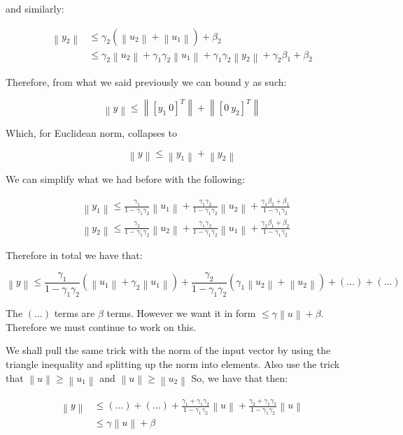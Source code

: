 \documentclass[11pt]{article}
\newcommand{\norm}[1]{\left\lVert#1\right\rVert}
\begin{document}
and similarly: 

\begin{align}
 \norm{y_2} & \leq \gamma_2 ( \norm{u_2} + \norm{u_1} ) + \beta_2 \\
 			& \leq \gamma_2 \norm{u_2} + \gamma_1 \gamma_2 \norm{u_1} + \gamma_1 \gamma_2 \norm{y_2} + \gamma_2 \beta_1 + \beta_2
\end{align}

Therefore, from what we said previously we can bound y as such:

\begin{equation}
	\norm{y} \leq \norm{ [ y_1 \  0 ]^T} + \norm{ [ 0 \  y_2 ]^T} 
\end{equation}

Which, for Euclidean norm, collapses to

\begin{equation}
	\norm{y} \leq \norm{ y_1 } + \norm{y_2} 
\end{equation}

We can simplify what we had before with the following: 


\begin{align}
& \norm{y_1} \leq \frac{\gamma_1}{1-\gamma_1\gamma_2}\norm{u_1} + \frac{\gamma_1\gamma_2}{1-\gamma_1\gamma_2}\norm{u_2} + \frac{\gamma_1 \beta_2 + \beta_1}{1-\gamma_1\gamma_2} \\
& \norm{y_2} \leq \frac{\gamma_2}{1-\gamma_1\gamma_2}\norm{u_2} + \frac{\gamma_1\gamma_2}{1-\gamma_1\gamma_2}\norm{u_1} + \frac{\gamma_2 \beta_1 + \beta_2}{1-\gamma_1\gamma_2}
\end{align}

Therefore in total we have that: 

\begin{equation}
	\norm{y} \leq \frac{\gamma_1}{1-\gamma_1\gamma_2}(\norm{u_1} + \gamma_2 \norm{u_1}) + \frac{\gamma_2}{1-\gamma_1\gamma_2}(\gamma_1\norm{u_2} + \norm{u_2} ) + (...) + (...)
\end{equation}

The $(...)$ terms are $\beta$ terms. However we want it in form $\leq \gamma\norm{u} + \beta$. Therefore we must continue to work on this.

We shall pull the same trick with the norm of the input vector by using the triangle inequality and splitting up the norm into elements. Also use the trick that $\norm{u} \geq \norm{u_1}$ and $\norm{u} \geq \norm{u_2}$  So, we have that then:

\begin{align}
	\norm{y} & \leq (...) + (...) + \frac{\gamma_1 +\gamma_1\gamma_2}{1-\gamma_1\gamma_2}\norm{u} + \frac{\gamma_2 +\gamma_1\gamma_2}{1-\gamma_1\gamma_2}\norm{u} \\
	& \leq \gamma \norm{u} + \beta
\end{align}
\end{document}
